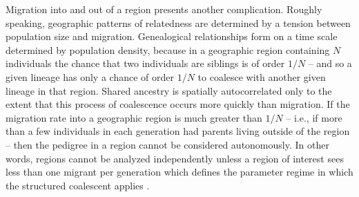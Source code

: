 \documentclass{ar-1col}
\newcommand{\g}[1]{{\color{blue}{#1}}}
\newcommand{\plr}[1]{{\color{green}{#1}}}
\begin{document}


Migration into and out of a region presents another complication.
Roughly speaking,
geographic patterns of relatedness
are determined by a tension between population size and migration.
Genealogical relationships form on a time scale determined by population density,
because in a geographic region containing $N$ individuals
the chance that two individuals are siblings is of order $1/N$ --
and so
a given lineage has only a chance of order $1/N$ to coalesce 
with another given lineage in that region.
Shared ancestry is spatially autocorrelated
only to the extent that this process of coalescence
occurs more quickly than migration.
If the migration rate into a geographic region is much greater than $1/N$ --
i.e., if more than a few individuals in each generation had parents living outside of the region --
then the pedigree in a region cannot be considered autonomously.
In other words,
regions cannot be analyzed independently
unless a region of interest sees less than one migrant per generation
which defines the parameter regime in which the structured coalescent applies \citep{nagylaki1998}.
\end{document}
